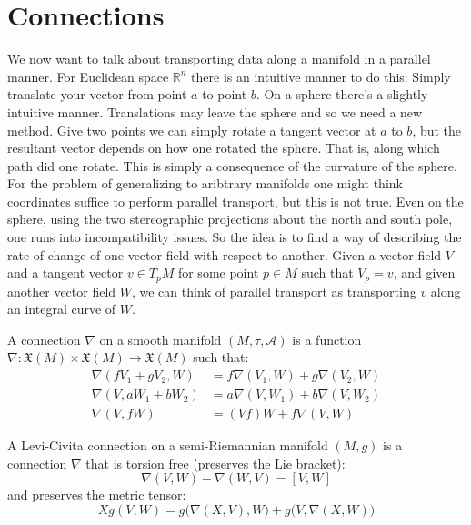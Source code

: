 \documentclass{article}                                                        %
\begin{document}
    \section{Connections}
        We now want to talk about transporting data along a manifold in a
        parallel manner. For Euclidean space $\mathbb{R}^{n}$ there is an
        intuitive manner to do this: Simply translate your vector from point $a$
        to point $b$. On a sphere there's a slightly intuitive manner.
        Translations may leave the sphere and so we need a new method. Give two
        points we can simply rotate a tangent vector at $a$ to $b$, but the
        resultant vector depends on how one rotated the sphere. That is, along
        which path did one rotate. This is simply a consequence of the curvature
        of the sphere. For the problem of generalizing to aribtrary
        manifolds one might think coordinates suffice to perform parallel
        transport, but this is not true. Even on the sphere, using the two
        stereographic projections about the north and south pole, one runs into
        incompatibility issues. So the idea is to find a way of describing the
        rate of change of one vector field with respect to another. Given a
        vector field $V$ and a tangent vector $v\in{T}_{p}M$ for some point
        $p\in{M}$ such that $V_{p}=v$, and given another vector field $W$,
        we can think of parallel transport as transporting $v$ along an
        integral curve of $W$.
        \begin{definition}
            A connection $\nabla$ on a smooth manifold $(M,\tau,\mathcal{A})$
            is a function $\nabla:\mathfrak{X}(M)\times\mathfrak{X}(M)%
            \rightarrow\mathfrak{X}(M)$ such that:
            \begin{align}
                \nabla(fV_{1}+gV_{2},W)
                    &=f\nabla(V_{1},W)+g\nabla(V_{2},W)\\
                \nabla(V,aW_{1}+bW_{2})
                    &=a\nabla(V,W_{1})+b\nabla(V,W_{2})\\
                \nabla(V,fW)&=
                    (Vf)W+f\nabla(V,W)
            \end{align}
        \end{definition}
        \begin{definition}
            A Levi-Civita connection on a semi-Riemannian manifold
            $(M,g)$ is a connection $\nabla$ that is torsion
            free (preserves the Lie bracket):
            \begin{equation}
                \nabla(V,W)-\nabla(W,V)=[V,W]
            \end{equation}
            and preserves the metric tensor:
            \begin{equation}
                Xg(V,W)=g\big(\nabla(X,V),W\big)+g\big(V,\nabla(X,W)\big)
            \end{equation}
        \end{definition}
\end{document}
